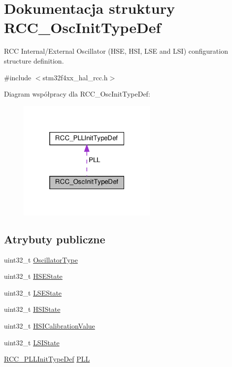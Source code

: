 \hypertarget{struct_r_c_c___osc_init_type_def}{}\section{Dokumentacja struktury R\+C\+C\+\_\+\+Osc\+Init\+Type\+Def}
\label{struct_r_c_c___osc_init_type_def}


R\+CC Internal/\+External Oscillator (H\+SE, H\+SI, L\+SE and L\+SI) configuration structure definition.  




{\ttfamily \#include $<$stm32f4xx\+\_\+hal\+\_\+rcc.\+h$>$}



Diagram współpracy dla R\+C\+C\+\_\+\+Osc\+Init\+Type\+Def\+:\nopagebreak
\begin{figure}[H]
\begin{center}
\leavevmode
\includegraphics[width=193pt]{struct_r_c_c___osc_init_type_def__coll__graph}
\end{center}
\end{figure}
\subsection*{Atrybuty publiczne}
\begin{DoxyCompactItemize}
\item 
uint32\+\_\+t \hyperlink{struct_r_c_c___osc_init_type_def_af9e7bc89cab81c1705d94c74c7a81088}{Oscillator\+Type}
\item 
uint32\+\_\+t \hyperlink{struct_r_c_c___osc_init_type_def_a7e05d6eec98ed8cdaba00ca3d167ff72}{H\+S\+E\+State}
\item 
uint32\+\_\+t \hyperlink{struct_r_c_c___osc_init_type_def_a7c1294e9407e69e80fe034caf35fe7ea}{L\+S\+E\+State}
\item 
uint32\+\_\+t \hyperlink{struct_r_c_c___osc_init_type_def_a39b62cae65fe7a251000354e5bba8cb6}{H\+S\+I\+State}
\item 
uint32\+\_\+t \hyperlink{struct_r_c_c___osc_init_type_def_a9b2e48e452d0c334f2b9473216064560}{H\+S\+I\+Calibration\+Value}
\item 
uint32\+\_\+t \hyperlink{struct_r_c_c___osc_init_type_def_a955de90db8882fde02c4fb59c7c000f0}{L\+S\+I\+State}
\item 
\hyperlink{struct_r_c_c___p_l_l_init_type_def}{R\+C\+C\+\_\+\+P\+L\+L\+Init\+Type\+Def} \hyperlink{struct_r_c_c___osc_init_type_def_af76de5ee86798f0c3a4c83c84dfa58be}{P\+LL}
\end{DoxyCompactItemize}


